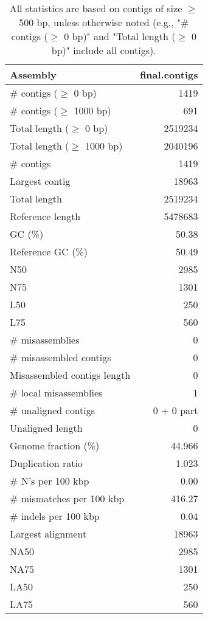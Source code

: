 \documentclass[12pt,a4paper]{article}
\begin{document}
\begin{table}[ht]
\begin{center}
\caption{All statistics are based on contigs of size $\geq$ 500 bp, unless otherwise noted (e.g., "\# contigs ($\geq$ 0 bp)" and "Total length ($\geq$ 0 bp)" include all contigs).}
\begin{tabular}{|l*{1}{|r}|}
\hline
Assembly & final.contigs \\ \hline
\# contigs ($\geq$ 0 bp) & 1419 \\ \hline
\# contigs ($\geq$ 1000 bp) & 691 \\ \hline
Total length ($\geq$ 0 bp) & 2519234 \\ \hline
Total length ($\geq$ 1000 bp) & 2040196 \\ \hline
\# contigs & 1419 \\ \hline
Largest contig & 18963 \\ \hline
Total length & 2519234 \\ \hline
Reference length & 5478683 \\ \hline
GC (\%) & 50.38 \\ \hline
Reference GC (\%) & 50.49 \\ \hline
N50 & 2985 \\ \hline
N75 & 1301 \\ \hline
L50 & 250 \\ \hline
L75 & 560 \\ \hline
\# misassemblies & 0 \\ \hline
\# misassembled contigs & 0 \\ \hline
Misassembled contigs length & 0 \\ \hline
\# local misassemblies & 1 \\ \hline
\# unaligned contigs & 0 + 0 part \\ \hline
Unaligned length & 0 \\ \hline
Genome fraction (\%) & 44.966 \\ \hline
Duplication ratio & 1.023 \\ \hline
\# N's per 100 kbp & 0.00 \\ \hline
\# mismatches per 100 kbp & 416.27 \\ \hline
\# indels per 100 kbp & 0.04 \\ \hline
Largest alignment & 18963 \\ \hline
NA50 & 2985 \\ \hline
NA75 & 1301 \\ \hline
LA50 & 250 \\ \hline
LA75 & 560 \\ \hline
\end{tabular}
\end{center}
\end{table}
\end{document}
